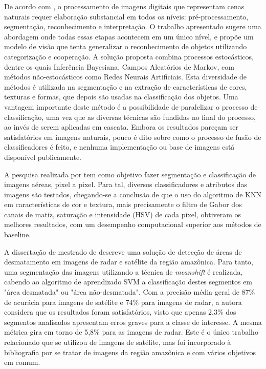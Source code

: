 De acordo com , o processamento de imagens digitais que representam cenas naturais requer elaboração substancial em todos os níveis: pré-processamento, segmentação, reconhecimento e interpretação. O trabalho apresentado sugere uma abordagem onde todas essas etapas acontecem em um único nível, e propõe um modelo de visão que tenta generalizar o reconhecimento de objetos utilizando categorização e cooperação.  A solução proposta combina processos estocásticos, dentre os quais Inferência Bayesiana, Campos Aleatórios de Markov, com métodos não-estocásticos como Redes Neurais Artificiais. Esta diversidade de métodos é utilizada na segmentação e na extração de características de cores, texturas e formas, que depois são usadas na classificação dos objetos. Uma vantagem importante deste método é a possibilidade de paralelizar o processo de classificação, uma vez que as diversas técnicas são fundidas no final do processo, ao invés de serem aplicadas em cascata. Embora os resultados pareçam ser satisfatórios em imagens naturais, pouco é dito sobre como o processo de fusão de classificadores é feito, e nenhuma implementação ou base de imagens está disponível publicamente.

A pesquisa realizada por  tem como objetivo fazer segmentação e classificação de imagens aéreas, pixel a pixel. Para tal, diversos classificadores e atributos das imagens são testados, chegando-se a conclusão de que o uso do algoritmo de KNN em características de cor e textura, mais precisamente o filtro de Gabor \cite{fogel:1989} dos canais de matiz, saturação e intensidade (HSV) de cada pixel, obtiveram os melhores resultados, com um desempenho computacional superior aos métodos de baseline.

A dissertação de mestrado de  descreve uma solução de detecção de áreas de desmatamento em imagens de radar e satélite da região amazônica. Para tanto, uma segmentação das imagens utilizando a técnica de \textit{meanshift} é realizada, cabendo ao algoritmo de aprendizado SVM a classificação destes segmentos em "área desmatada" ou "área não-desmatada". Com a precisão média geral de 87\% de acurácia para imagens de satélite e 74\% para imagens de radar, a autora considera que os resultados foram satisfatórios, visto que apenas 2,3\% dos segmentos analisados apresentam erros graves para a classe de interesse. A mesma métrica gira em torno de 5,8\% para as imagens de radar. Este é o único trabalho relacionado que se utilizou de imagens de satélite, mas foi incorporado à bibliografia por se tratar de imagens da região amazônica e com vários objetivos em comum.

